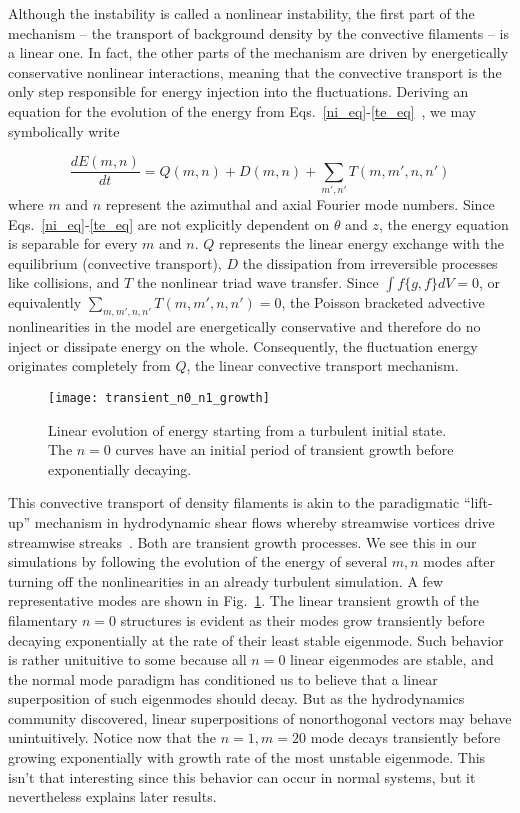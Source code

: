 \documentclass[letter,scriptaddress,twocolumn, prl,showkeys]{revtex4}
\def\beq{\begin{equation}}
\def\eeq{\end{equation}}
\newcommand{\diff}[2]{\frac{d#1}{d#2}}
\begin{document}
Although the instability is called a nonlinear instability, the first part of the mechanism -- the transport of background density by the convective filaments -- is a linear one.
In fact, the other parts of the mechanism are driven by energetically conservative nonlinear interactions, 
meaning that the convective transport is the only step responsible for energy injection into the fluctuations.
Deriving an equation for the evolution of the energy from Eqs.~\ref{ni_eq}-\ref{te_eq}~\cite{friedman2012b,friedman2013}, we may symbolically write

\beq
\label{dEdt_def}
\diff{E(m,n)}{t} = Q(m,n) + D(m,n) + \sum_{m',n'} T(m,m',n,n')
\eeq
where $m$ and $n$ represent the azimuthal and axial Fourier mode numbers. 
Since Eqs.~\ref{ni_eq}-\ref{te_eq} are not explicitly dependent on $\theta$ and $z$, the energy equation is separable for every $m$ and $n$. 
$Q$ represents the linear energy exchange with the equilibrium (convective transport), $D$ the dissipation from irreversible processes
like collisions, and $T$ the nonlinear triad wave transfer. Since $\int f \{g,f\} dV = 0$, or equivalently $\sum_{m,m',n,n'} T(m,m',n,n')=0$, 
the Poisson bracketed advective nonlinearities in the model are energetically conservative and therefore do no inject or dissipate energy on the whole.
Consequently, the fluctuation energy originates completely from $Q$, the linear convective transport mechanism.

\begin{figure}
\centerline{\texttt{[image: transient\_n0\_n1\_growth]}}
\caption{Linear evolution of energy starting from a turbulent initial state. The $n=0$ curves have an initial period of transient growth before exponentially decaying.}
\label{transient_n0_n1_growth}
\end{figure}

This convective transport of density filaments is akin to the paradigmatic ``lift-up'' mechanism in hydrodynamic shear flows whereby streamwise vortices drive streamwise streaks~\cite{krommes1999}.
Both are transient growth processes. We see this in our simulations by following the evolution of the energy of several $m,n$ modes after turning off the nonlinearities in an already
turbulent simulation. A few representative modes are shown in Fig.~\ref{transient_n0_n1_growth}. The linear transient growth of the filamentary $n=0$ structures is evident as their modes 
grow transiently before decaying exponentially at the rate of their least stable eigenmode. Such behavior is rather unituitive to some because all $n=0$ linear eigenmodes are stable, 
and the normal mode paradigm has conditioned us to believe that a linear superposition of such eigenmodes should decay. But as the hydrodynamics community discovered, linear
superpositions of nonorthogonal vectors may behave unintuitively.
Notice now that the $n=1,m=20$ mode decays transiently before growing exponentially with growth rate of the most unstable eigenmode. This isn't that interesting since this behavior
can occur in normal systems, but it nevertheless explains later results.
\end{document}
